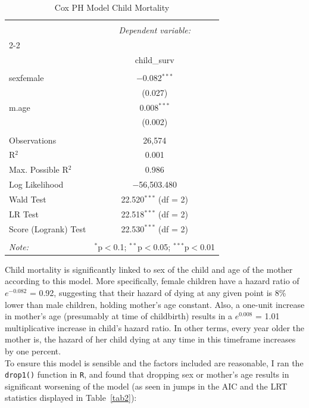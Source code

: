 \documentclass[12pt,letterpaper]{article}
\begin{document}
\begin{table}[!htbp] \centering 
	\caption{Cox PH Model Child Mortality} 
	\label{tab1} 
	\begin{tabular}{@{\extracolsep{5pt}}lc} 
		\\[-1.8ex]\hline 
		\hline \\[-1.8ex] 
		& \multicolumn{1}{c}{\textit{Dependent variable:}} \\ 
		\cline{2-2} 
		\\[-1.8ex] & child\_surv \\ 
		\hline \\[-1.8ex] 
		sexfemale & $-$0.082$^{***}$ \\ 
		& (0.027) \\ 
		m.age & 0.008$^{***}$ \\ 
		& (0.002) \\ 
		\hline \\[-1.8ex] 
		Observations & 26,574 \\ 
		R$^{2}$ & 0.001 \\ 
		Max. Possible R$^{2}$ & 0.986 \\ 
		Log Likelihood & $-$56,503.480 \\ 
		Wald Test & 22.520$^{***}$ (df = 2) \\ 
		LR Test & 22.518$^{***}$ (df = 2) \\ 
		Score (Logrank) Test & 22.530$^{***}$ (df = 2) \\ 
		\hline 
		\hline \\[-1.8ex] 
		\textit{Note:}  & \multicolumn{1}{r}{$^{*}$p$<$0.1; $^{**}$p$<$0.05; $^{***}$p$<$0.01} \\ 
	\end{tabular} 
\end{table}

Child mortality is significantly linked to sex of the child and age of the mother according to this model. More specifically, female children have a hazard ratio of $e^{-0.082}$ = 0.92, suggesting that their hazard of dying at any given point is 8\% lower than male children, holding mother's age constant. Also, a one-unit increase in mother's age (presumably at time of childbirth) results in a $e^{0.008}$ = 1.01 multiplicative increase in child's hazard ratio. In other terms, every year older the mother is, the hazard of her child dying at any time in this timeframe increases by one percent.\\

To ensure this model is sensible and the factors included are reasonable, I ran the \texttt{drop1()} function in \texttt{R}, and found that dropping sex or mother's age results in significant worsening of the model (as seen in jumps in the AIC and the LRT statistics displayed in Table~\ref{tab2}):\\
\end{document}
